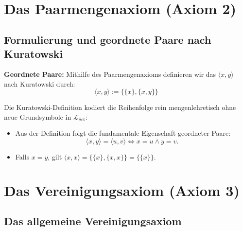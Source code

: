 \section{Das Paarmengenaxiom (Axiom 2)}

\subsection{Formulierung und geordnete Paare nach Kuratowski}

\begin{math-stroke}
\begin{axioms}
\end{axioms}

\textbf{Geordnete Paare:}
Mithilfe des Paarmengenaxioms definieren wir das  $\langle x, y \rangle$ nach Kuratowski durch:
\[
\langle x, y \rangle := \bigl\{ \{x\}, \{x, y\} \bigr\}
\]

\begin{explanation-of-steps}
Die Kuratowski-Definition kodiert die Reihenfolge rein mengenlehretisch ohne neue Grundsymbole in $\mathcal{L}_{\text{Set}}$:
\begin{itemize}
    \item Aus der Definition folgt die fundamentale Eigenschaft geordneter Paare:
    \[
    \langle x, y \rangle = \langle u, v \rangle \iff x = u \land y = v.
    \]
    \item Falls $x = y$, gilt $\langle x, x \rangle = \{\{x\}, \{x, x\}\} = \{\{x\}\}$.
\end{itemize}
\end{explanation-of-steps}
\end{math-stroke}

\section{Das Vereinigungsaxiom (Axiom 3)}

\subsection{Das allgemeine Vereinigungsaxiom}

